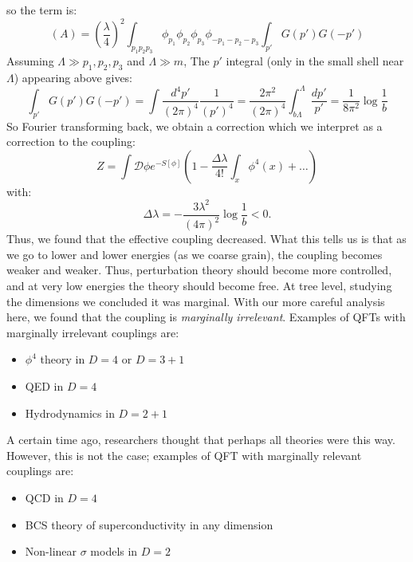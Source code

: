 so the term is:
\begin{equation}
    (A) = \left(\frac{\lambda}{4}\right)^2\int_{p_1p_2p_3}\phi_{p_1}\phi_{p_2}\phi_{p_3}\phi_{-p_1-p_2-p_3}\int_{p'}G(p')G(-p')
\end{equation}
Assuming $\Lambda \gg p_1, p_2, p_3$ and $\Lambda \gg m$, The $p'$ integral (only in the small shell near $\Lambda$) appearing above gives:
\begin{equation}
    \int_{p'}G(p')G(-p') = \int \frac{d^4p'}{(2\pi)^4}\frac{1}{(p')^4} = \frac{2\pi^2}{(2\pi)^4}\int_{b\Lambda}^\Lambda \frac{dp'}{p'} = \frac{1}{8\pi^2}\log \frac{1}{b}
\end{equation}
So Fourier transforming back, we obtain a correction which we interpret as a correction to the coupling:
\begin{equation}
    Z = \int \mathcal{D}\phi e^{-S[\phi]}\left(1 - \frac{\Delta \lambda}{4!}\int_x \phi^4(x) + \ldots\right)
\end{equation}
with:
\begin{equation}
    \Delta \lambda = -\frac{3\lambda^2}{(4\pi)^2}\log \frac{1}{b} < 0.
\end{equation}
Thus, we found that the effective coupling decreased. What this tells us is that as we go to lower and lower energies (as we coarse grain), the coupling becomes weaker and weaker. Thus, perturbation theory should become more controlled, and at very low energies the theory should become free. At tree level, studying the dimensions we concluded it was marginal. With our more careful analysis here, we found that the coupling is \emph{marginally irrelevant}. Examples of QFTs with marginally irrelevant couplings are:
\begin{itemize}
    \item $\phi^4$ theory in $D = 4$ or $D = 3 + 1$
    \item QED in $D = 4$
    \item Hydrodynamics in $D = 2 + 1$
\end{itemize}
A certain time ago, researchers thought that perhaps all theories were this way. However, this is not the case; examples of QFT with marginally relevant couplings are:
\begin{itemize}
    \item QCD in $D = 4$
    \item BCS theory of superconductivity in any dimension
    \item Non-linear $\sigma$ models in $D = 2$
\end{itemize}

